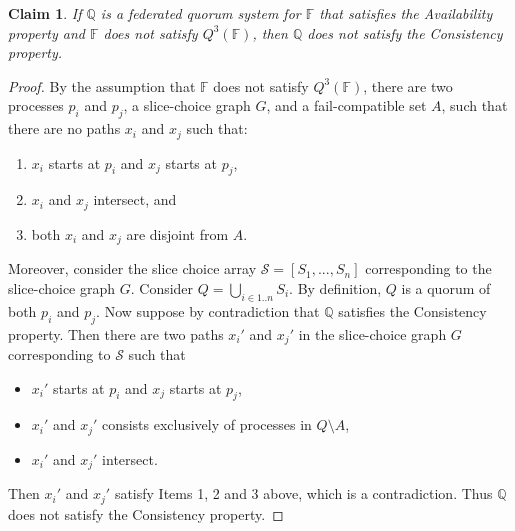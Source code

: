 \documentclass[11pt]{article}
\newtheorem{claim}{Claim}
\begin{document}
\begin{claim}
  If $\mathbb{Q}$ is a federated quorum system for $\mathbb{F}$ that satisfies the Availability property and $\mathbb{F}$ does not satisfy $Q^3(\mathbb{F})$, then $\mathbb{Q}$ does not satisfy the Consistency property.
\end{claim}
\begin{proof}
  By the assumption that $\mathbb{F}$ does not satisfy $Q^3(\mathbb{F})$, there are two processes $p_i$ and $p_j$, a slice-choice graph $G$, and a fail-compatible set $A$, such that there are no paths $x_i$ and $x_j$ such that:
  \begin{enumerate}
    \item $x_i$ starts at $p_i$ and $x_j$ starts at $p_j$,
    \item $x_i$ and $x_j$ intersect, and
    \item both $x_i$ and $x_j$ are disjoint from $A$.
  \end{enumerate}
  Moreover, consider the slice choice array $\mathcal{S}=\left[S_1,...,S_n\right]$ corresponding to the slice-choice graph $G$.
  Consider $Q=\bigcup_{i\in 1..n}S_i$. By definition, $Q$ is a quorum of both $p_i$ and $p_j$.
  Now suppose by contradiction that $\mathbb{Q}$ satisfies the Consistency property. Then there are two paths $x_i'$ and $x_j'$ in the slice-choice graph $G$ corresponding to $\mathcal{S}$ such that
  \begin{itemize}
    \item $x_i'$ starts at $p_i$ and $x_j$ starts at $p_j$,
    \item $x_i'$ and $x_j'$ consists exclusively of processes in $Q\setminus A$,
    \item $x_i'$ and $x_j'$ intersect.
  \end{itemize}
  Then $x_i'$ and $x_j'$ satisfy Items 1, 2 and 3 above, which is a contradiction. Thus $\mathbb{Q}$ does not satisfy the Consistency property.
\end{proof}

\end{document}
